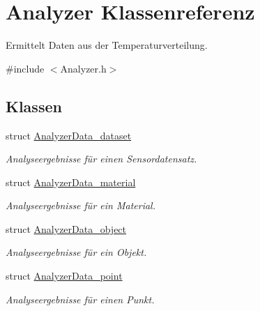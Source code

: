 \hypertarget{classAnalyzer}{\section{Analyzer Klassenreferenz}
\label{classAnalyzer}
}


Ermittelt Daten aus der Temperaturverteilung.  




{\ttfamily \#include $<$Analyzer.\-h$>$}

\subsection*{Klassen}
\begin{DoxyCompactItemize}
\item 
struct \hyperlink{structAnalyzer_1_1AnalyzerData__dataset}{Analyzer\-Data\-\_\-dataset}
\begin{DoxyCompactList}\small\item\em Analyseergebnisse für einen Sensordatensatz. \end{DoxyCompactList}\item 
struct \hyperlink{structAnalyzer_1_1AnalyzerData__material}{Analyzer\-Data\-\_\-material}
\begin{DoxyCompactList}\small\item\em Analyseergebnisse für ein Material. \end{DoxyCompactList}\item 
struct \hyperlink{structAnalyzer_1_1AnalyzerData__object}{Analyzer\-Data\-\_\-object}
\begin{DoxyCompactList}\small\item\em Analyseergebnisse für ein Objekt. \end{DoxyCompactList}\item 
struct \hyperlink{structAnalyzer_1_1AnalyzerData__point}{Analyzer\-Data\-\_\-point}
\begin{DoxyCompactList}\small\item\em Analyseergebnisse für einen Punkt. \end{DoxyCompactList}\end{DoxyCompactItemize}
